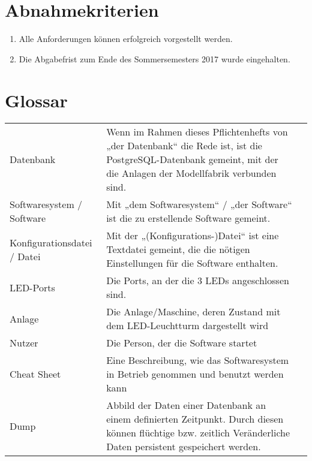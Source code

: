 \documentclass{scrartcl}
\begin{document}
\section{Abnahmekriterien}
\begin{enumerate}[label=/AK\arabic*/]
\item Alle Anforderungen können erfolgreich vorgestellt werden.
\item Die Abgabefrist zum Ende des Sommersemesters 2017 wurde eingehalten.
\end{enumerate}

\section{Glossar}

\begin{tabular}{>{\raggedright}p{.25\linewidth} >{\raggedright}p{.65\linewidth} l}
Datenbank & Wenn im Rahmen dieses Pflichtenhefts von „der Datenbank“ die Rede ist, ist die PostgreSQL-Datenbank gemeint, mit der die Anlagen der Modellfabrik verbunden sind.&\\
Softwaresystem / Software & Mit „dem Softwaresystem“ / „der Software“ ist die zu erstellende Software gemeint.&\\
Konfigurationsdatei / Datei & Mit der „(Konfigurations-)Datei“ ist eine Textdatei gemeint, die die nötigen Einstellungen für die Software enthalten.&\\
LED-Ports & Die Ports, an der die 3 LEDs angeschlossen sind.&\\
Anlage & Die Anlage/Maschine, deren Zustand mit dem LED-Leuchtturm dargestellt wird&\\
Nutzer & Die Person, der die Software startet&\\
Cheat Sheet & Eine Beschreibung, wie das Softwaresystem in Betrieb genommen und benutzt werden kann &\\
Dump & Abbild der Daten einer Datenbank an einem definierten Zeitpunkt. Durch diesen können flüchtige bzw. zeitlich Veränderliche Daten persistent gespeichert werden.
\end{tabular}
\vspace*{7em}
\par\noindent\makebox[2.5in]{\hrulefill}\hfill\makebox[2.0in]{\hrulefill}
\par\noindent{}\hfill{}

\vspace*{5em}
\par\noindent\makebox[2.5in]{\hrulefill}\hfill\makebox[2.0in]{\hrulefill}
\par\noindent{}\hfill{}
\end{document}
